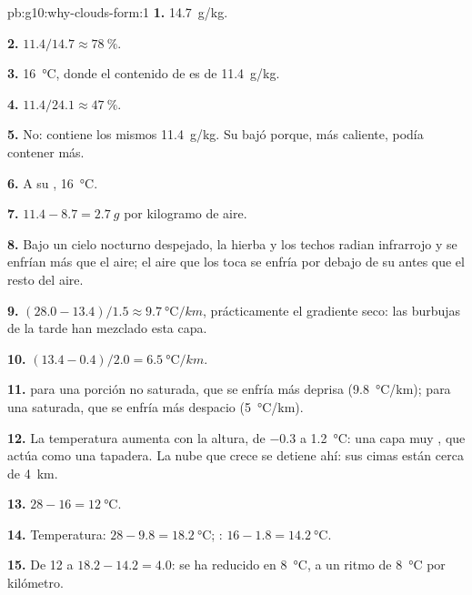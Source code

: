 \begin{solution}{pb:g10:why-clouds-form:1}
\textbf{1.} \qty{14.7}{g/kg}.

\textbf{2.} $11.4/14.7 \approx \qty{78}{\percent}$.

\textbf{3.} \qty{16}{\degreeCelsius}, donde el contenido de  es de
\qty{11.4}{g/kg}.

\textbf{4.} $11.4/24.1 \approx \qty{47}{\percent}$.

\textbf{5.} No: contiene los mismos \qty{11.4}{g/kg}. Su 
bajó porque, más caliente, podía contener más.

\textbf{6.} A su , \qty{16}{\degreeCelsius}.

\textbf{7.} $11.4 - 8.7 = \qty{2.7}{g}$ por kilogramo de aire.

\textbf{8.} Bajo un cielo nocturno despejado, la hierba y los techos radian
infrarrojo y se enfrían más que el aire; el aire que los toca se enfría por
debajo de su  antes que el resto del aire.

\textbf{9.} $(28.0 - 13.4)/1.5 \approx \qty{9.7}{\degreeCelsius/km}$,
prácticamente el gradiente seco: las burbujas de la tarde han mezclado esta
capa.

\textbf{10.} $(13.4 - 0.4)/2.0 = \qty{6.5}{\degreeCelsius/km}$.

\textbf{11.}  para una porción no saturada, que se enfría más deprisa
(\qty{9.8}{\degreeCelsius/km});  para una saturada, que se enfría
más despacio (\qty{5}{\degreeCelsius/km}).

\textbf{12.} La temperatura aumenta con la altura, de \num{-0.3} a
\qty{1.2}{\degreeCelsius}: una capa muy , que actúa como una
tapadera. La nube que crece se detiene ahí: sus cimas están cerca de
\qty{4}{km}.

\textbf{13.} $28 - 16 = \qty{12}{\degreeCelsius}$.

\textbf{14.} Temperatura: $28 - 9.8 = \qty{18.2}{\degreeCelsius}$; : $16 - 1.8 = \qty{14.2}{\degreeCelsius}$.

\textbf{15.} De 12 a $18.2 - 14.2 = 4.0$: se ha reducido en
\qty{8}{\degreeCelsius}, a un ritmo de \qty{8}{\degreeCelsius} por
kilómetro.


\end{solution}
